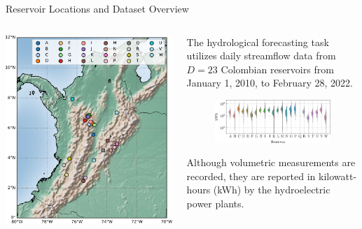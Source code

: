 \begin{frame}{Reservoir Locations and Dataset Overview}
	\begin{columns}[T] %
		\begin{column}{0.45\textwidth}
			\includegraphics[width=\linewidth]{images/colombiamap.pdf}
		
		\end{column}
		\begin{column}{0.55\textwidth}
			\justifying %
			\begin{block}{}
			The hydrological forecasting task utilizes daily streamflow data from $D=23$ Colombian reservoirs from January 1, 2010, to February 28, 2022.
			\end{block}
			\begin{figure}[htbp]
				\centering
				\includegraphics[width=\textwidth]{images/ct_violinplot.pdf}
			\end{figure}
			\begin{block}{}
			Although volumetric measurements are recorded, they are reported in kilowatt-hours (kWh) by the hydroelectric power plants.
			\end{block}
		\end{column}
	\end{columns}
\end{frame}

